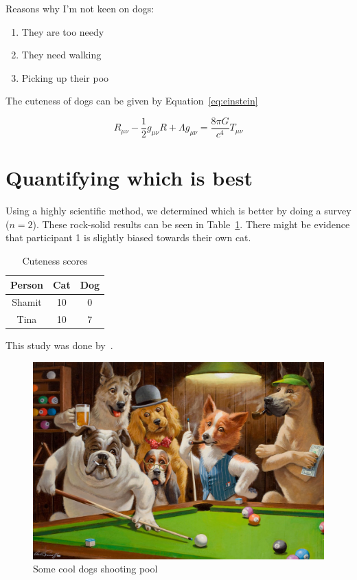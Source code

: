 \documentclass[11pt,a4paper]{report}
\begin{document}
Reasons why I’m not keen on dogs:

\begin{enumerate}
    \item They are too needy
    \item They need walking
    \item Picking up their poo
\end{enumerate}

The cuteness of dogs can be given by Equation~\ref{eq:einstein}

\begin{equation}
R_{\mu\nu} - \frac{1}{2} g_{\mu\nu} R + \Lambda g_{\mu\nu} = \frac{8 \pi G}{c^4} T_{\mu\nu}
\label{eq:einstein}
\end{equation}


\section{Quantifying which is best}

Using a highly scientific method, we determined which is better by doing a survey ($n=2$). These rock-solid results can be seen in Table~\ref{tab:cute}. There might be evidence that participant 1 is slightly biased towards their own cat.


\begin{table}[h]
\centering
\begin{tabular}{|c|c|c|}
\hline
Person & Cat & Dog \\
\hline
Shamit & 10 & 0 \\ 
Tina & 10 & 7 \\
\hline
\end{tabular}
\caption{Cuteness scores}
\label{tab:cute} %
\end{table}


This study was done by~\citep{Legetth2021-nh,May2013-bu}.

\begin{figure}
      \includegraphics[width=\linewidth]{figs/dogs_pool.jpg}
      \caption{Some cool dogs shooting pool}
      \label{fig:pool}
\end{figure}
\end{document}
